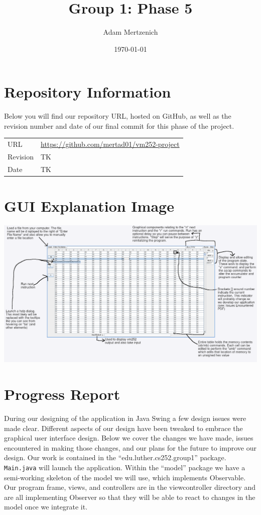 \documentclass[11pt]{article}
\author{Adam Mertzenich}
\date{\today}
\title{Group 1: Phase 5}
\begin{document}
\maketitle
\tableofcontents


\section{Repository Information}
\label{sec:orgddc31ca}

Below you will find our repository URL, hosted on GitHub, as well as the revision number and date of our final commit for this phase of the project.

\begin{center}
\begin{tabular}{ll}
URL & \url{https://github.com/mertad01/vm252-project}\\
Revision & TK\\
Date & TK\\
\end{tabular}
\end{center}

\section{GUI Explanation Image}
\label{sec:orge6f3bb9}

\begin{center}
\includegraphics[width=.9\linewidth]{./annotated-screenshot.png}
\end{center}

\section{Progress Report}
\label{sec:org95c91f7}

During our designing of the application in Java Swing a few design issues were made clear. Different aspects of our design have been tweaked to embrace the graphical user interface design. Below we cover the changes we have made, issues encountered in making those changes, and our plans for the future to improve our design. Our work is contained in the ``edu.luther.cs252.group1'' package. \texttt{Main.java} will launch the application. Within the ``model'' package we have a semi-working skeleton of the model we will use, which implements Observable. Our program frame, views, and controllers are in the viewcontroller directory and are all implementing Observer so that they will be able to react to changes in the model once we integrate it.
\end{document}
